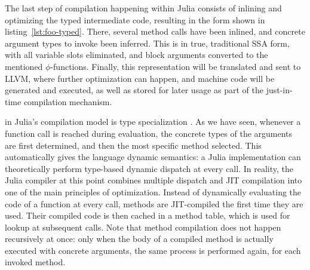 The last step of compilation happening within Julia consists of inlining and optimizing the typed
intermediate code, resulting in the form shown in listing~\ref{lst:foo-typed}.  There, several method calls have been inlined, and concrete argument types to invoke been
inferred.  This is in true, traditional SSA form, with all variable slots eliminated, and block
arguments converted to the mentioned \(\phi\)-functions.  Finally, this representation will be
translated and sent to LLVM, where further optimization can happen, and machine code will be
generated and executed, as well as stored for later usage as part of the just-in-time compilation
mechanism.

 in Julia's compilation model is type specialization
\parencite{bezanson2018julia}.  As we have seen, whenever a function call is reached during
evaluation, the concrete types of the arguments are first determined, and then the most specific
method selected.  This automatically gives the language dynamic semantics: a Julia implementation
can theoretically perform type-based dynamic dispatch at every call.  In reality, the Julia compiler
at this point combines multiple dispatch and JIT compilation into one of the main principles of
optimization.  Instead of dynamically evaluating the code of a function at every call, methods are
JIT-compiled the first time they are used.  Their compiled code is then cached in a method table,
which is used for lookup at subsequent calls.  Note that method compilation does not happen
recursively at once: only when the body of a compiled method is actually executed with concrete
arguments, the same process is performed again, for each invoked method.

